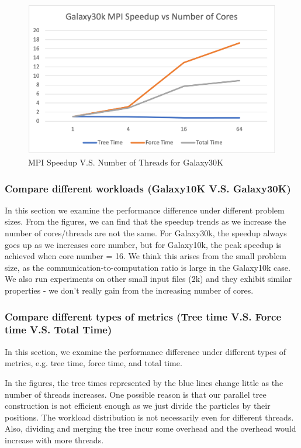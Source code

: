 \documentclass{article}
\begin{document}
\begin{figure}[h!]
  \includegraphics[width=\textwidth]{img/30k_mpi.png}
  \caption{MPI Speedup V.S. Number of Threads for Galaxy30K}
  \label{30k_mpi}
\end{figure}

\subsubsection{Compare different workloads (Galaxy10K V.S. Galaxy30K)}

In this section we examine the performance difference under different problem sizes. From the figures, we can find that the speedup trends as we increase the number of cores/threads are not the same. For Galaxy30k, the speedup always goes up as we increases core number, but for Galaxy10k, the peak speedup is achieved when core number = 16. We think this arises from the small problem size, as the communication-to-computation ratio is large in the Galaxy10k case. We also run experiments on other small input files (2k) and they exhibit similar properties - we don't really gain from the increasing number of cores. 

\subsubsection{Compare different types of metrics (Tree time V.S. Force time V.S. Total Time)}
In this section, we examine the performance difference under different types of metrics, e.g. tree time, force time, and total time. 

In the figures, the tree times represented by the blue lines change little as the number of threads increases. One possible reason is that our parallel tree construction is not efficient enough as we just divide the particles by their positions. The workload distribution is not necessarily even for different threads. Also, dividing and merging the tree incur some overhead and the overhead would increase with more threads. 
\end{document}

